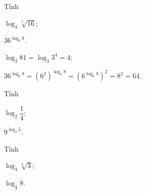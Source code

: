 \begin{bt}%
 
	Tính
	\begin{listEX}[2]
		\item  $\log _{4} \sqrt[5]{16}$;
		\item $36^{\log _{6} 8}$.
	\end{listEX}
	\loigiai
	{\begin{listEX}[1]
			\item $\log _3 81=\log _3 3^4=4$;
			\item $36^{\log _{6} 8}=\left(6^{2}\right)^{\log _{6} 8}=\left(6^{\log _{6} 8}\right)^{2}=8^{2}=64$.
		\end{listEX}
	}
\end{bt}

\begin{bt}%
	Tính
	\begin{listEX}[2]
		\item[a)] $ \log_2 \dfrac{1}{4}$;
		\item[b)] $ 9^{\log_3 5} $.
	\end{listEX}
\end{bt}

\begin{bt}%
	Tính
	\begin{listEX}[2]
		\item[a)] $ \log_3 \sqrt[3]{3}$;
		\item[b)] $ \log_{\frac{1}{2}} 8 $.
	\end{listEX}
\end{bt}


